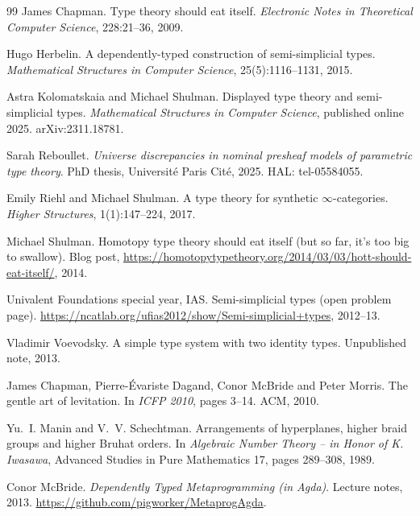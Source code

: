 \documentclass[11pt]{article}
\begin{document}
\begin{thebibliography}{99}
James Chapman.
\newblock Type theory should eat itself.
\newblock \emph{Electronic Notes in Theoretical Computer Science},
  228:21--36, 2009.

Hugo Herbelin.
\newblock A dependently-typed construction of semi-simplicial types.
\newblock \emph{Mathematical Structures in Computer Science},
  25(5):1116--1131, 2015.

Astra Kolomatskaia and Michael Shulman.
\newblock Displayed type theory and semi-simplicial types.
\newblock \emph{Mathematical Structures in Computer Science}, published online
  2025. arXiv:2311.18781.

Sarah Reboullet.
\newblock \emph{Universe discrepancies in nominal presheaf models of parametric
  type theory}.
\newblock PhD thesis, Universit\'e Paris Cit\'e, 2025.
\newblock HAL: tel-05584055.

Emily Riehl and Michael Shulman.
\newblock A type theory for synthetic $\infty$-categories.
\newblock \emph{Higher Structures}, 1(1):147--224, 2017.

Michael Shulman.
\newblock Homotopy type theory should eat itself (but so far, it's too big to
  swallow).
\newblock Blog post, \url{https://homotopytypetheory.org/2014/03/03/hott-should-eat-itself/},
  2014.

Univalent Foundations special year, IAS.
\newblock Semi-simplicial types (open problem page).
\newblock \url{https://ncatlab.org/ufias2012/show/Semi-simplicial+types},
  2012--13.

Vladimir Voevodsky.
\newblock A simple type system with two identity types.
\newblock Unpublished note, 2013.

James Chapman, Pierre-Évariste Dagand, Conor McBride and Peter Morris.
\newblock The gentle art of levitation.
\newblock In \emph{ICFP 2010}, pages 3--14. ACM, 2010.

Yu.~I. Manin and V.~V. Schechtman.
\newblock Arrangements of hyperplanes, higher braid groups and higher Bruhat
  orders.
\newblock In \emph{Algebraic Number Theory -- in Honor of K. Iwasawa},
  Advanced Studies in Pure Mathematics 17, pages 289--308, 1989.

Conor McBride.
\newblock \emph{Dependently Typed Metaprogramming (in Agda)}.
\newblock Lecture notes, 2013.
\newblock \url{https://github.com/pigworker/MetaprogAgda}.
\end{thebibliography}
\end{document}
